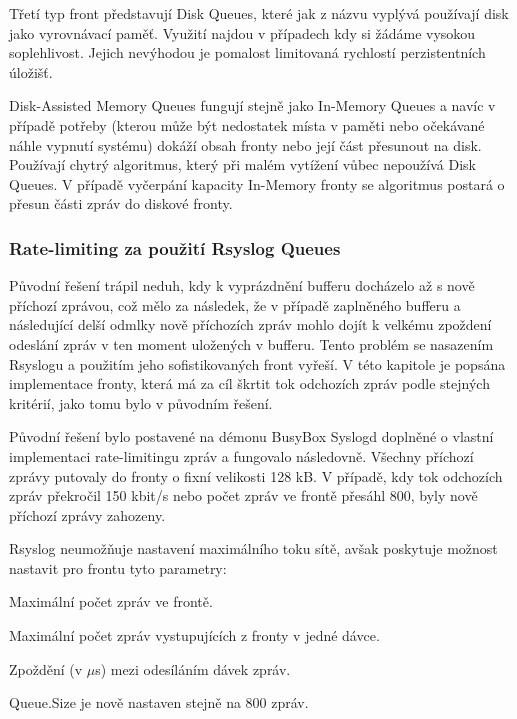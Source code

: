 \documentclass[thesis=B,czech]{FITthesis}[2012/06/26]
\begin{document}
Třetí typ front představují Disk Queues, které jak z názvu vyplývá používají disk jako vyrovnávací paměť. Využití najdou v případech kdy si žádáme vysokou soplehlivost. Jejich nevýhodou je pomalost limitovaná rychlostí perzistentních úložišť.

Disk-Assisted Memory Queues fungují stejně jako In-Memory Queues a navíc v případě potřeby (kterou může být nedostatek místa v paměti nebo očekávané náhle vypnutí systému) dokáží obsah fronty nebo její část přesunout na disk. Používají chytrý algoritmus, který při malém vytížení vůbec nepoužívá Disk Queues. V případě vyčerpání kapacity In-Memory fronty se algoritmus postará o přesun části zpráv do diskové fronty.

\subsubsection*{Rate-limiting za použití Rsyslog Queues}
Původní řešení trápil neduh, kdy k vyprázdnění bufferu docházelo až s nově příchozí zprávou, což mělo za následek, že v případě zaplněného bufferu a následující delší odmlky nově příchozích zpráv mohlo dojít k velkému zpoždení odeslání zpráv v ten moment uložených v bufferu. Tento problém se nasazením Rsyslogu a použitím jeho sofistikovaných front vyřeší.
V této kapitole je popsána implementace fronty, která má za cíl škrtit tok odchozích zpráv podle stejných kritérií, jako tomu bylo v původním řešení.

Původní řešení bylo postavené na démonu BusyBox Syslogd doplněné o vlastní implementaci rate-limitingu zpráv a fungovalo následovně. Všechny příchozí zprávy putovaly do fronty o fixní velikosti 128 kB. V případě, kdy tok odchozích zpráv překročil 150 kbit/s nebo počet zpráv ve frontě přesáhl 800, byly nově příchozí zprávy zahozeny.

Rsyslog neumožňuje nastavení maximálního toku sítě, avšak poskytuje možnost nastavit pro frontu tyto parametry:
\begin{description}
  \setlength\itemsep{-1ex}
  \item [Queue.Size:] Maximální počet zpráv ve frontě.
  \item [Queue.Dequeuebatchsize:] Maximální počet zpráv vystupujících z fronty v jedné dávce.
  \item [Queue.Dequeueslowdown:] Zpoždění (v $\mu$s) mezi odesíláním dávek zpráv.
\end{description}

Queue.Size je nově nastaven stejně na 800 zpráv.
\end{document}
